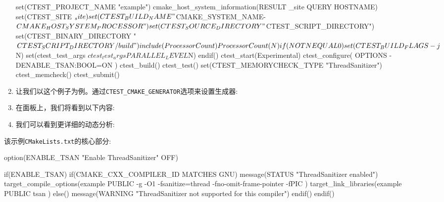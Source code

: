 \begin{enumerate}
\begin{codebox}[cmake]
set(CTEST_PROJECT_NAME "example")
cmake_host_system_information(RESULT _site QUERY HOSTNAME)
set(CTEST_SITE ${_site})
set(CTEST_BUILD_NAME "${CMAKE_SYSTEM_NAME}-${CMAKE_HOST_SYSTEM_PROCESSOR}")
set(CTEST_SOURCE_DIRECTORY "${CTEST_SCRIPT_DIRECTORY}")
set(CTEST_BINARY_DIRECTORY "${CTEST_SCRIPT_DIRECTORY}/build")
include(ProcessorCount)
ProcessorCount(N)
if(NOT N EQUAL 0)
  set(CTEST_BUILD_FLAGS -j${N})
  set(ctest_test_args ${ctest_test_args} PARALLEL_LEVEL ${N})
endif()
ctest_start(Experimental)
ctest_configure(
  OPTIONS
    -DENABLE_TSAN:BOOL=ON
  )
ctest_build()
ctest_test()
set(CTEST_MEMORYCHECK_TYPE "ThreadSanitizer")
ctest_memcheck()
ctest_submit()
\end{codebox}

\item 让我们以这个例子为例。通过\texttt{CTEST\_CMAKE\_GENERATOR}选项来设置生成器:


\item 在面板上，我们将看到以下内容:


\item 我们可以看到更详细的动态分析:


\end{enumerate}


该示例\texttt{CMakeLists.txt}的核心部分:

\begin{codebox}[cmake]
option(ENABLE_TSAN "Enable ThreadSanitizer" OFF)

if(ENABLE_TSAN)
  if(CMAKE_CXX_COMPILER_ID MATCHES GNU)
    message(STATUS "ThreadSanitizer enabled")
    target_compile_options(example
    PUBLIC
        -g -O1 -fsanitize=thread -fno-omit-frame-pointer -fPIC
    )
    target_link_libraries(example
      PUBLIC
        tsan
      )
  else()
    message(WARNING "ThreadSanitizer not supported for this compiler")
  endif()
endif()
\end{codebox}

